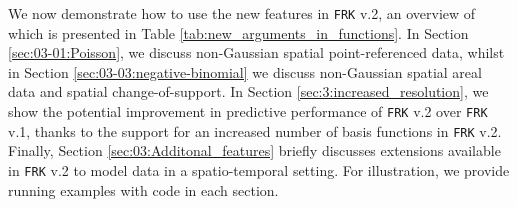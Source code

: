 \documentclass[12pt,a4paper]{article}
\begin{document}
We now demonstrate how to use the new features in \texttt{FRK} v.2, an overview of which is presented in Table \ref{tab:new_arguments_in_functions}.
In Section \ref{sec:03-01:Poisson}, we discuss non-Gaussian spatial point-referenced data, whilst in Section \ref{sec:03-03:negative-binomial} we discuss non-Gaussian  spatial areal data and spatial change-of-support.
In Section \ref{sec:3:increased_resolution}, we show the potential improvement in predictive performance of \texttt{FRK} v.2 over \texttt{FRK} v.1, thanks to the support for an increased number of basis functions in \texttt{FRK} v.2.
Finally, Section \ref{sec:03:Additonal_features} briefly discusses extensions available in \texttt{FRK} v.2 to model data in a spatio-temporal setting. 
For illustration, we provide running examples with code in each section.

\end{document}
